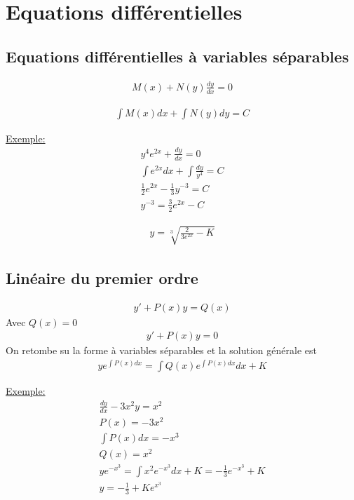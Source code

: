 \chapter{Equations différentielles}
\section{Equations différentielles à variables séparables}
\begin{eqnarray}
	M(x)+N(y)\frac{dy}{dx}=0
\end{eqnarray}

\begin{eqnarray}
	\int M(x)dx+\int N(y)dy = C
\end{eqnarray}

\underline{Exemple:}
\begin{eqnarray*}
	y^4e^{2x}+\frac{dy}{dx}=0\\
	\int e^{2x}dx+\int\frac{dy}{y^4}=C\\
	\frac{1}{2}e^{2x}-\frac{1}{3}y^{-3}=C\\
	y^{-3}=\frac{3}{2}e^{2x}-C
\end{eqnarray*}

\begin{eqnarray}
	y=\sqrt[3]{\frac{2}{3e^{2x}}-K}
\end{eqnarray}
\section{Linéaire du premier ordre}
\begin{eqnarray}
	y'+P(x)y=Q(x)
\end{eqnarray}
Avec $Q(x)=0$
\begin{eqnarray}
	y'+P(x)y=0
\end{eqnarray}
On retombe su la forme à variables séparables et la solution générale est
\begin{eqnarray}
	ye^{\int P(x)dx}=\int Q(x)e^{\int P(x)dx}dx+K
\end{eqnarray}

\underline{Exemple:}
\begin{eqnarray*}
	\frac{dy}{dx}-3x^2y=x^2\\
	P(x)=-3x^2\\
	\int P(x)dx=-x^3\\
	Q(x)=x^2\\
	ye^{-x^3}=\int x^2e^{-x^3}dx+K=-\frac{1}{3}e^{-x^3}+K
	\\
	y=-\frac{1}{3}+Ke^{x^3}
\end{eqnarray*}

